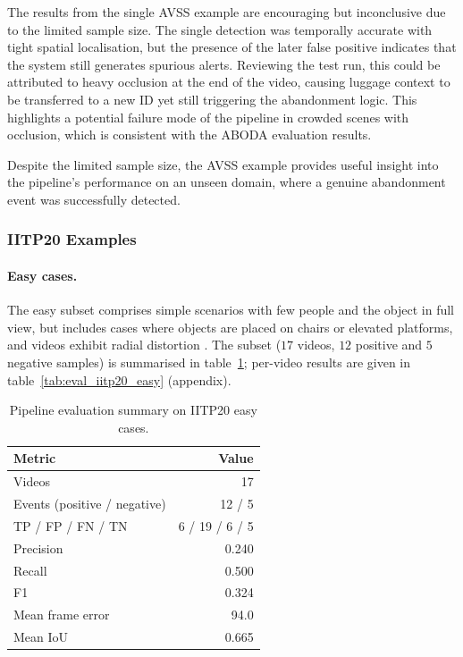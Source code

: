 The results from the single AVSS example are encouraging but inconclusive due
to the limited sample size. The single detection was temporally accurate with
tight spatial localisation, but the presence of the later false positive
indicates that the system still generates spurious alerts. Reviewing the test
run, this could be attributed to heavy occlusion at the end of the video,
causing luggage context to be transferred to a new ID yet still triggering the
abandonment logic. This highlights a potential failure mode of the pipeline in
crowded scenes with occlusion, which is consistent with the ABODA evaluation
results.

Despite the limited sample size, the AVSS example provides useful insight into
the pipeline's performance on an unseen domain, where a genuine abandonment
event was successfully detected.

\subsubsection[IITP20 Examples]{IITP20 Examples \protect\citep{amin2021large}}

\paragraph{Easy cases.}

The easy subset comprises simple scenarios with few people and the object in
full view, but includes cases where objects are placed on chairs or elevated
platforms, and videos exhibit radial distortion \citep{amin2021large}. The
subset ($17$ videos, $12$ positive and $5$ negative samples) is summarised in
table~\ref{tab:eval_iitp20_easy_summary}; per-video results are given in
table~\ref{tab:eval_iitp20_easy} (appendix).

\begin{table}[!htbp]
	\centering
	\small
	\begin{tabularx}{0.5\textwidth}{@{}>{\raggedright\arraybackslash}X r@{}}
		\toprule
		\textbf{Metric}              & \textbf{Value} \\
		\midrule
		Videos                       & 17             \\
		Events (positive / negative) & 12 / 5         \\
		TP / FP / FN / TN            & 6 / 19 / 6 / 5 \\
		Precision                    & 0.240          \\
		Recall                       & 0.500          \\
		F1                           & 0.324          \\
		Mean frame error             & 94.0           \\
		Mean IoU                     & 0.665          \\
		\bottomrule
	\end{tabularx}
	\caption{Pipeline evaluation summary on IITP20 easy cases.}
	\label{tab:eval_iitp20_easy_summary}
\end{table}

